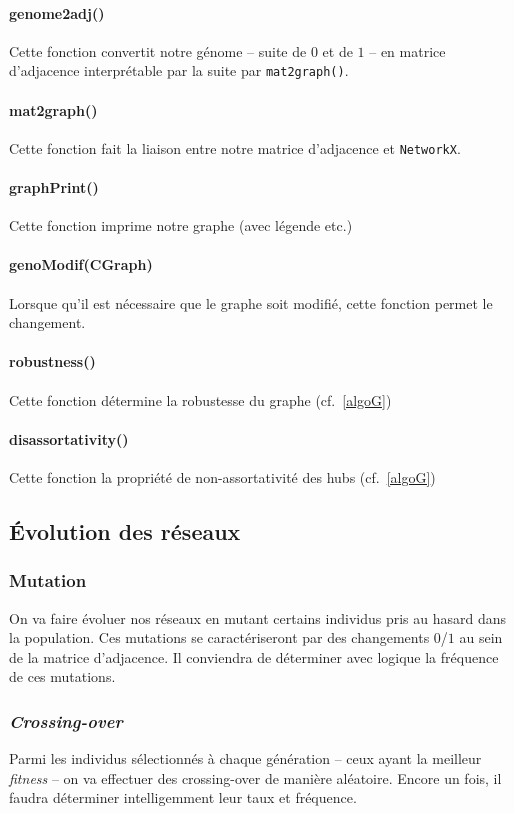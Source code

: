 \paragraph*{genome2adj()} Cette fonction convertit notre génome -- suite de $0$ et de $1$ -- en matrice d'adjacence interprétable par la suite par \verb?mat2graph()?.
\paragraph*{mat2graph()} Cette fonction fait la liaison entre notre matrice d'adjacence et \verb?NetworkX?.
\paragraph*{graphPrint()} Cette fonction imprime notre graphe (avec légende etc.)
\paragraph*{genoModif(CGraph)} Lorsque qu'il est nécessaire que le graphe soit modifié, cette fonction permet le changement.
\paragraph*{robustness()} Cette fonction détermine la robustesse du graphe (cf.~\ref{algoG})
\paragraph*{disassortativity()} Cette fonction la propriété de non-assortativité des hubs (cf.~\ref{algoG})


\subsection{Évolution des réseaux}
\subsubsection{Mutation}
On va faire évoluer nos réseaux en mutant certains individus pris au hasard dans la population. Ces mutations se caractériseront par des changements $0$/$1$ au sein de la matrice d'adjacence. Il conviendra de déterminer avec logique la fréquence de ces mutations.

\subsubsection{\textit{Crossing-over}}
Parmi les individus sélectionnés à chaque génération -- ceux ayant la meilleur \textit{fitness} -- on va effectuer des crossing-over de manière aléatoire. Encore un fois, il faudra déterminer intelligemment leur taux et fréquence.

